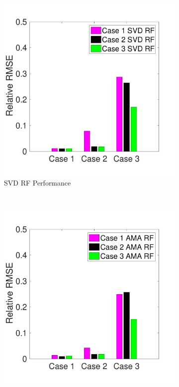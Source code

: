 \documentclass{jov}
\begin{document}
\begin{figure}
\begin{subfigure}{0.3 \textwidth}
	\includegraphics[width=\textwidth]{../Figures/Figure8/Figure8_b.pdf}
	\caption{SVD RF Performance}
	\label{fig:SVDBAR}
    \end{subfigure}
    ~ %
        \begin{subfigure}{0.3 \textwidth}
	\includegraphics[width=\textwidth]{../Figures/Figure8/Figure8_c.pdf}

\end{subfigure}
\end{figure}
\end{document}
